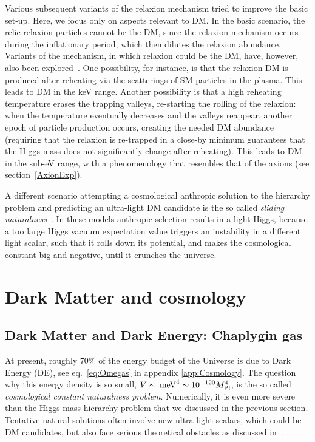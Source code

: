 \smallskip

Various subsequent variants of the relaxion mechanism tried to  improve the basic set-up. Here, we focus only on aspects relevant to DM.
In the basic scenario, the relic relaxion particles cannot be the DM, since the relaxion mechanism occurs during the inflationary period, which then dilutes the relaxion abundance. 
Variants of the mechanism, in which relaxion could be the DM, have, however, also been explored~\cite{relaxion}. 
One possibility, for instance, is that the relaxion DM is produced after reheating via the scatterings of SM particles in the plasma. This leads to DM in the keV range. 
Another possibility is that a high reheating temperature erases the trapping valleys, re-starting the rolling of the relaxion: when the temperature eventually decreases and the valleys reappear, another epoch of particle production occurs, creating the needed DM abundance (requiring that the relaxion is re-trapped in a close-by minimum guarantees that the Higgs mass does not significantly change after reheating). This leads to DM in the sub-eV range, with a phenomenology that resembles that of the axions (see section~\ref{AxionExp}).

\smallskip

A different scenario attempting a cosmological anthropic solution to the hierarchy problem and predicting an ultra-light DM candidate is the so called {\em sliding naturalness}~\cite{relaxion}.
In these models anthropic selection results in a light Higgs, because a too large Higgs vacuum expectation value triggers an instability in a different light scalar, such that it rolls down its potential, and makes
the cosmological constant big and negative, until it crunches the universe.






\section{Dark Matter and cosmology}\label{sec:DMcosmo}
\subsection{Dark Matter and Dark Energy: Chaplygin gas}

At present, roughly 70\% of the energy budget of the Universe is due to Dark Energy (DE), see eq.~\eqref{eq:Omegas} in appendix \ref{app:Cosmology}. 
The question why  this energy density is so small, $V \sim \,{\rm meV}^4 \sim 10^{-120}M_{\rm Pl}^4$, is the so called {\em cosmological constant naturalness problem}. 
Numerically, it is even more severe than the Higgs mass hierarchy problem that we discussed in the previous section. 
Tentative natural solutions often involve new ultra-light scalars, which could be DM candidates,
but also face serious theoretical obstacles as discussed in~\cite{Cosmological.constant}.


